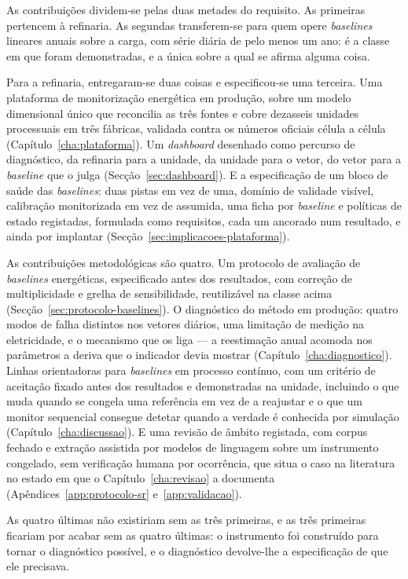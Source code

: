 As contribuições dividem-se pelas duas metades do requisito. As
primeiras pertencem à refinaria. As segundas transferem-se para quem
opere \emph{baselines} lineares anuais sobre a carga, com série diária
de pelo menos um ano: é a classe em que foram demonstradas, e a única
sobre a qual se afirma alguma coisa.

Para a refinaria, entregaram-se duas coisas e especificou-se uma
terceira. Uma plataforma de monitorização energética em produção, sobre
um modelo dimensional único que reconcilia as três fontes e cobre
dezasseis unidades processuais em três fábricas, validada contra os
números oficiais célula a célula (Capítulo~\ref{cha:plataforma}). Um
\emph{dashboard} desenhado como percurso de diagnóstico, da refinaria
para a unidade, da unidade para o vetor, do vetor para a \emph{baseline}
que o julga (Secção~\ref{sec:dashboard}). E a especificação de um bloco
de saúde das \emph{baselines}: duas pistas em vez de uma, domínio de
validade visível, calibração monitorizada em vez de assumida, uma ficha
por \emph{baseline} e políticas de estado registadas, formulada como
requisitos, cada um ancorado num resultado, e ainda por implantar
(Secção~\ref{sec:implicacoes-plataforma}).

As contribuições metodológicas são quatro. Um protocolo de avaliação de
\emph{baselines} energéticas, especificado antes dos resultados, com
correção de multiplicidade e grelha de sensibilidade, reutilizável na
classe acima (Secção~\ref{sec:protocolo-baselines}). O diagnóstico do
método em produção: quatro modos de falha distintos nos vetores diários,
uma limitação de medição na eletricidade, e o mecanismo que os liga --- a
reestimação anual acomoda nos parâmetros a deriva que o indicador devia
mostrar (Capítulo~\ref{cha:diagnostico}). Linhas orientadoras para
\emph{baselines} em processo contínuo, com um critério de aceitação
fixado antes dos resultados e demonstradas na unidade, incluindo o que muda quando se congela
uma referência em vez de a reajustar e o que um monitor sequencial
consegue detetar quando a verdade é conhecida por simulação
(Capítulo~\ref{cha:discussao}). E uma revisão de âmbito
registada, com corpus fechado e extração assistida por modelos de
linguagem sobre um instrumento congelado, sem verificação humana por
ocorrência, que situa o caso na literatura no estado em que o
Capítulo~\ref{cha:revisao} a documenta (Apêndices~\ref{app:protocolo-sr}
e~\ref{app:validacao}).

As quatro últimas não existiriam sem as três primeiras, e as três
primeiras ficariam por acabar sem as quatro últimas: o instrumento foi
construído para tornar o diagnóstico possível, e o diagnóstico
devolve-lhe a especificação de que ele precisava.

